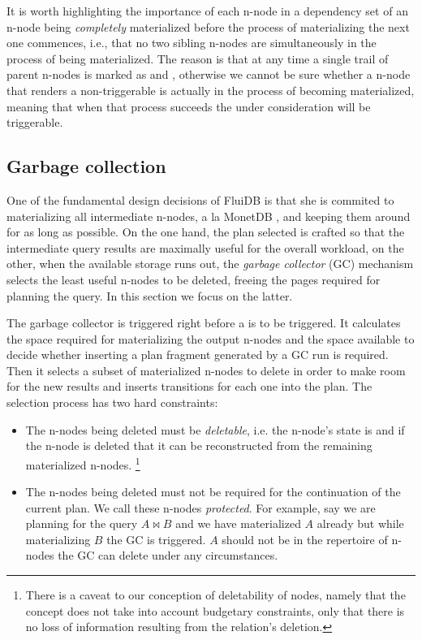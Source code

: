 It is worth highlighting the importance of each n-node in a dependency set of an n-node
being \emph{completely} materialized before the process of materializing the
next one commences, i.e., that no two sibling n-nodes are
simultaneously in the process of being materialized. The reason is
that at any time a single trail of parent n-nodes is marked as
 and , otherwise we cannot be sure whether a
 n-node that renders a 
non-triggerable is actually in the process of becoming materialized,
meaning that when that process succeeds the  under
consideration will be triggerable.

\subsection{Garbage collection}
\label{sec:gc}

One of the fundamental design decisions of FluiDB is that she is
commited to materializing all intermediate n-nodes, a la MonetDB \cite{monetdb}, and keeping them
around for as long as possible. On the one hand, the plan selected is
crafted so that the intermediate query results are maximally useful for the
overall workload, on the other, when the available storage runs out,
the \emph{garbage collector} (GC) mechanism selects the least useful n-nodes to be
deleted, freeing the pages required for planning the query. In this section
we focus on the latter.

The garbage collector is triggered right before a  is to
be triggered. It calculates the space required for materializing the
output n-nodes and the space available to decide whether inserting a
plan fragment generated by a GC run is required. Then it selects a
subset of materialized n-nodes to delete in order to make room for the
new results and inserts  transitions for each one into the
plan. The selection process has two hard constraints:

\begin{itemize}
\item The n-nodes being deleted must be \emph{deletable}, i.e. the
  n-node's state is  and if the n-node is deleted that it
  can be reconstructed from the remaining materialized n-nodes. 
  \footnote{There is a caveat to our conception of deletability of nodes, namely that 
  the concept does not take into account budgetary constraints, only that there is no 
  loss of information resulting from the relation's deletion.}
\item The n-nodes being deleted must not be required for the
  continuation of the current plan. We call these n-nodes
  \emph{protected}. For example, say we are planning for the query
  \(A \Join B\) and we have materialized \(A\) already but while
  materializing \(B\) the GC is triggered. \(A\) should not be in the
  repertoire of n-nodes the GC can delete under any circumstances.
\end{itemize}

